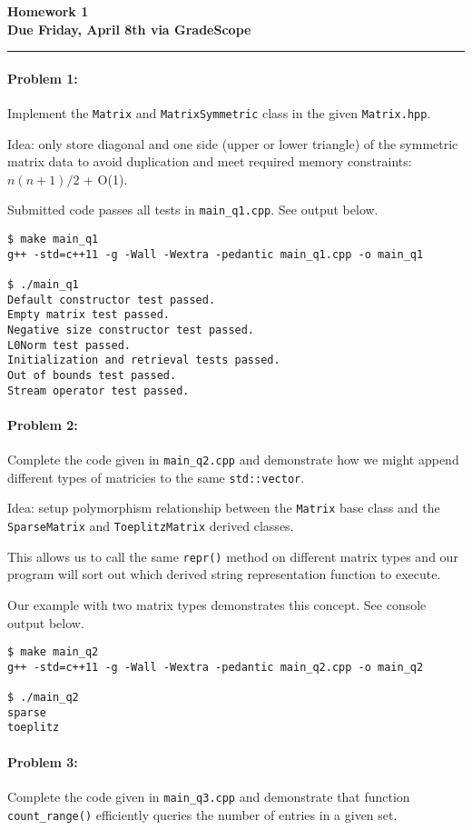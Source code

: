 \documentclass[12pt,letterpaper,twoside]{article}
\begin{document}
{\centering \textbf{Homework 1\\ Due Friday, April 8th via GradeScope\\}}
\vspace*{-8pt}\noindent\rule{\linewidth}{1pt}

\paragraph{Problem 1: } Implement the \texttt{Matrix} and \texttt{MatrixSymmetric} 
class in the given \texttt{Matrix.hpp}. 

Idea: only store diagonal and one side (upper or lower triangle) 
of the symmetric matrix data to avoid duplication and meet required memory 
constraints: $n(n+1)/2$ + O(1).

Submitted code passes all tests in \texttt{main\_q1.cpp}. See output below.
\begin{verbatim}
$ make main_q1
g++ -std=c++11 -g -Wall -Wextra -pedantic main_q1.cpp -o main_q1

$ ./main_q1
Default constructor test passed.
Empty matrix test passed.
Negative size constructor test passed.
L0Norm test passed.
Initialization and retrieval tests passed.
Out of bounds test passed.
Stream operator test passed.
\end{verbatim}


\paragraph{Problem 2: } Complete the code given in \texttt{main\_q2.cpp} 
and demonstrate how we might append different types of matricies to the 
same \texttt{std::vector}.

Idea: setup polymorphism relationship between the \texttt{Matrix} 
base class and the \texttt{SparseMatrix} and \texttt{ToeplitzMatrix}
derived classes. 

This allows us to call the same \texttt{repr()} method 
on different matrix types and our program will sort out which derived 
string representation function to execute.

Our example with two matrix types demonstrates this concept.
See console output below.
\begin{verbatim}
$ make main_q2
g++ -std=c++11 -g -Wall -Wextra -pedantic main_q2.cpp -o main_q2

$ ./main_q2
sparse
toeplitz
\end{verbatim}


\paragraph{Problem 3: } Complete the code given in \texttt{main\_q3.cpp}
and demonstrate that function \texttt{count\_range()} efficiently queries
the number of entries in a given set.
\end{document}
